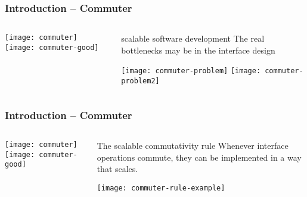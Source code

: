 \begin{frame}[plain]
	\frametitle{Introduction -- Commuter}
	
	
	\begin{columns}
		
		\begin{column}{.3\textwidth}	
			
			\texttt{[image: commuter]}
			\texttt{[image: commuter-good]}
			
		\end{column}
		
		\begin{column}{.7\textwidth}
		
		\LARGE
		\begin{block}{ scalable software development}
			The real bottlenecks may be in the interface design
			
		\end{block}
		\centering
		\texttt{[image: commuter-problem]}
		\texttt{[image: commuter-problem2]}	
		\end{column}
		
	\end{columns}
	
	
\end{frame}	


\begin{frame}[plain]
	\frametitle{Introduction -- Commuter}
	
	
	\begin{columns}
		
		\begin{column}{.3\textwidth}	
			
			\texttt{[image: commuter]}
			\texttt{[image: commuter-good]}
			
		\end{column}
		
		\begin{column}{.7\textwidth}
			
			\LARGE
			\begin{block}{The scalable commutativity rule}
				Whenever interface operations commute,
				they can be implemented in a way that scales.
				
				
			\end{block}
			\centering
			\texttt{[image: commuter-rule-example]}

		\end{column}
		
	\end{columns}
	
	
\end{frame}	




